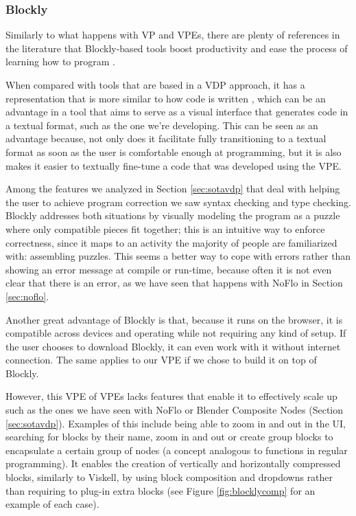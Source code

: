 \subsubsection{Blockly}
\label{sec:fblock}

Similarly to what happens with VP and VPEs, there are plenty of references
in the literature that Blockly-based tools boost productivity \cite{Marron2012} and ease the process
of learning how to program \cite{Junior2006}.

When compared with tools that are
based in a VDP approach, it has a representation that is more similar to how code
is written \cite{blockly}, which can be an advantage in a tool that aims to serve as a visual
interface that generates code in a textual format, such as the one we're developing.
This can be seen as an advantage because, not only does it facilitate fully transitioning
to a textual format as soon as the user is comfortable enough at programming,
but it is also makes it easier to textually fine-tune a code that was developed
using the VPE.

Among the features we analyzed in Section \ref{sec:sotavdp} that deal with
helping the user to achieve program correction we saw syntax checking and type
checking. Blockly addresses both situations by visually modeling the program
as a puzzle where only compatible pieces fit together; this is an intuitive way
to enforce correctness, since it maps to an activity the majority of people are
familiarized with: assembling puzzles. This seems a better way to cope with errors
rather than showing an error message at compile or run-time, because often it is
not even clear that there is an error, as we have seen that happens with NoFlo in
Section \ref{sec:noflo}.

Another great advantage of Blockly is that, because it runs on the browser, it is
compatible across devices and operating while not requiring any kind of setup.
If the user chooses to download Blockly, it can even work with it without internet
connection. The same applies to our VPE if we chose to build it on top of Blockly.

However, this VPE of VPEs lacks features that enable it to effectively scale up
such as the ones we have seen with NoFlo or Blender Composite Nodes (Section \ref{sec:sotavdp}).
Examples of this include being able to zoom in and out in the UI, searching for
blocks by their name, zoom in and out or create group blocks to encapsulate a certain group of
nodes (a concept analogous to functions in regular programming). It enables the
creation of vertically and horizontally compressed blocks, similarly to Viskell,
by using block composition and dropdowns rather than requiring to plug-in extra blocks
(see Figure \ref{fig:blocklycomp} for an example of each case).

